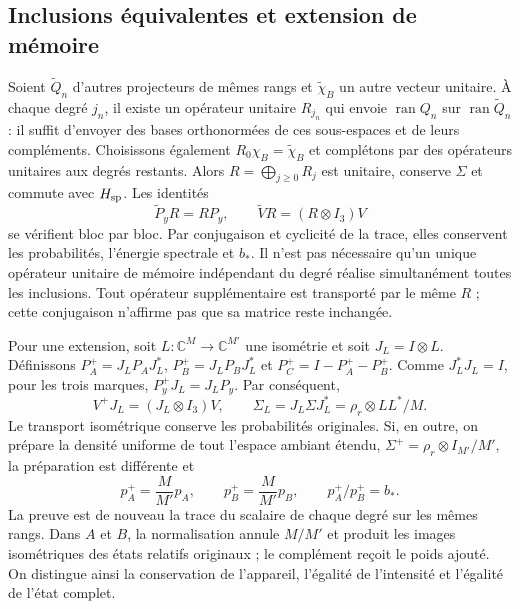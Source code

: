 \subsection{Inclusions équivalentes et extension de mémoire}
\label{subsec:ii-tins-inclusiones}

Soient $\widetilde Q_n$ d’autres projecteurs de mêmes rangs et
$\widetilde \chi_B$ un autre vecteur unitaire. À chaque degré $j_n$, il existe un opérateur unitaire
$R_{j_n}$ qui envoie $\operatorname{ran}Q_n$ sur
$\operatorname{ran}\widetilde Q_n$ : il suffit d’envoyer des bases orthonormées de ces
sous-espaces et de leurs compléments. Choisissons également $R_0\chi_B=\widetilde \chi_B$
et complétons par des opérateurs unitaires aux degrés restants. Alors
$R=\bigoplus_{j\ge0}R_j$ est unitaire, conserve $\Sigma$ et commute avec
$H_{\rm sp}$. Les identités
\begin{equation}
 \widetilde P_yR=RP_y,\qquad
 \widetilde V R=(R\otimes I_3)V
 \label{eq:ii-tins-inclusion}
\end{equation}
se vérifient bloc par bloc. Par conjugaison et cyclicité de la trace,
elles conservent les probabilités, l’énergie spectrale et $b_*$. Il n’est pas nécessaire qu’un
unique opérateur unitaire de mémoire indépendant du degré réalise simultanément
toutes les inclusions. Tout opérateur supplémentaire est transporté par le
même $R$ ; cette conjugaison n’affirme pas que sa matrice reste inchangée.

Pour une extension, soit $L:\mathbb C^M\to\mathbb C^{M'}$ une isométrie
et soit $J_L=I\otimes L$. Définissons
$P_A^+=J_LP_AJ_L^*$, $P_B^+=J_LP_BJ_L^*$ et
$P_C^+=I-P_A^+-P_B^+$. Comme $J_L^*J_L=I$, pour les trois marques,
$P_y^+J_L=J_LP_y$. Par conséquent,
\begin{equation}
 V^+J_L=(J_L\otimes I_3)V,
 \qquad \Sigma_L=J_L\Sigma J_L^*=\rho_r\otimes LL^*/M.
 \label{eq:ii-tins-extension}
\end{equation}
Le transport isométrique conserve les probabilités originales.
Si, en outre, on prépare la densité uniforme de tout l’espace ambiant étendu,
$\Sigma^+=\rho_r\otimes I_{M'}/M'$, la préparation est différente et
\begin{equation}
 p_A^+=\frac{M}{M'}p_A,\qquad
 p_B^+=\frac{M}{M'}p_B,\qquad p_A^+/p_B^+=b_*.
 \label{eq:ii-tins-uniform-extension}
\end{equation}
La preuve est de nouveau la trace du scalaire de chaque degré sur les mêmes
rangs. Dans $A$ et $B$, la normalisation annule $M/M'$ et produit les images
isométriques des états relatifs originaux ; le complément reçoit le
poids ajouté. On distingue ainsi la conservation de l’appareil, l’égalité de
l’intensité et l’égalité de l’état complet.

